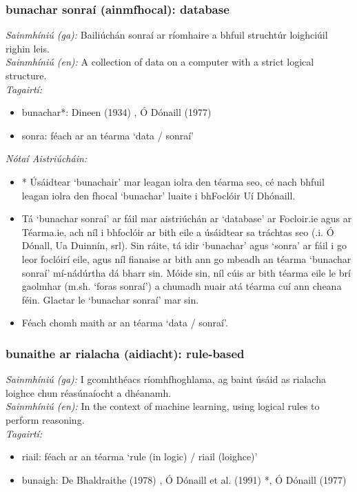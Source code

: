 \subsubsection*{bunachar sonraí (ainmfhocal): database}
 \noindent \textit{Sainmhíniú (ga):} Bailiúchán sonraí ar ríomhaire a bhfuil struchtúr loighciúil righin leis.
\\
 \noindent \textit{Sainmhíniú (en):} A collection of data on a computer with a strict logical structure.
\\
 \noindent \textit{Tagairtí:}
\begin{itemize}
	\item bunachar*: Dineen (1934) \cite{dineen}, Ó Dónaill (1977) \cite{odonaill}
	\item sonra: féach ar an téarma `data / sonraí'
\end{itemize}

 \noindent \textit{Nótaí Aistriúcháin:}
\begin{itemize}
	\item * Úsáidtear `bunachair' mar leagan iolra den téarma seo, cé nach bhfuil leagan iolra den fhocal `bunachar' luaite i bhFoclóir Uí Dhónaill.
	\item Tá `bunachar sonraí' ar fáil mar aistriúchán ar `database' ar Focloir.ie agus ar Téarma.ie, ach níl i bhfoclóir ar bith eile a úsáidtear sa tráchtas seo (.i. Ó Dónall, Ua Duinnín, srl). Sin ráite, tá idir `bunachar' agus `sonra' ar fáil i go leor foclóirí eile, agus níl fianaise ar bith ann go mbeadh an téarma `bunachar sonraí' mí-nádúrtha dá bharr sin. Móide sin, níl cúis ar bith téarma eile le brí gaolmhar (m.sh. `foras sonraí') a chumadh nuair atá téarma cuí ann cheana féin. Glactar le `bunachar sonraí' mar sin.
	\item Féach chomh maith ar an téarma `data / sonraí'.
\end{itemize}


\subsubsection*{bunaithe ar rialacha (aidiacht): rule-based}
 \noindent \textit{Sainmhíniú (ga):} I gcomhthéacs ríomhfhoghlama, ag baint úsáid as rialacha loighce chun réasúnaíocht a dhéanamh.
\\
 \noindent \textit{Sainmhíniú (en):} In the context of machine learning, using logical rules to perform reasoning.
\\
 \noindent \textit{Tagairtí:}
\begin{itemize}
	\item riail: féach ar an téarma `rule (in logic) / riail (loighce)'
	\item bunaigh: De Bhaldraithe (1978) \cite{de-bhaldraithe}, Ó Dónaill et al. (1991) \cite{focloir-beag}*, Ó Dónaill (1977) \cite{odonaill}
\end{itemize}

